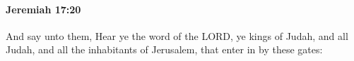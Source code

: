 
		\paragraph{Jeremiah 17:20} %
			\label{JEREMIAH-17-20}

			And say unto them, Hear ye the word of the LORD, ye kings of Judah, and all Judah, and all the inhabitants of Jerusalem, that enter in by these gates:


